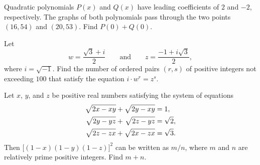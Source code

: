 \documentclass[11pt]{article}
\theoremstyle{definition}
\begin{document}
\begin{question}[name={2022 AIME I, \href{https://artofproblemsolving.com/community/c4p24368517}{Problem 1}}]
	Quadratic polynomials $P(x)$ and $Q(x)$ have leading coefficients of $2$ and $-2$, respectively. The graphs of both polynomials pass through the two points $(16,54)$ and $(20,53)$. Find ${P(0) + Q(0)}$.	
\end{question}


%	













\begin{question}[name={2022 AIME I, \href{https://artofproblemsolving.com/community/c4p24368559}{Problem 4}}]
	Let $$w = \frac{\sqrt{3}+i}{2} \qquad \text{and} \qquad z=\frac{-1+i\sqrt{3}}{2},$$ where $i=\sqrt{-1}$. Find the number of ordered pairs $(r, s)$ of positive integers not exceeding $100$ that satisfy the equation $i\cdot w^r=z^s$.	
	
\end{question}


%	












\begin{question}[name={2022 AIME I, \href{https://artofproblemsolving.com/community/c4p24368532}{Problem 15}}]
	Let $x$, $y$, and $z$ be positive real numbers satisfying the system of equations
	\begin{align*}
		\sqrt{2x - xy} + \sqrt{2y - xy} & = 1,\\
		\sqrt{2y - yz} + \hspace{0.1em} \sqrt{2z - yz} & = \sqrt{2},\\
		\sqrt{2z - zx\vphantom{y}} + \sqrt{2x - zx\vphantom{y}} & = \sqrt{3}.
	\end{align*}Then $\big[ (1-x)(1-y)(1-z) \big] ^2$ can be written as ${m}/{n}$, where $m$ and $n$ are relatively prime positive integers. Find $m+n$.
\end{question}
\end{document}
